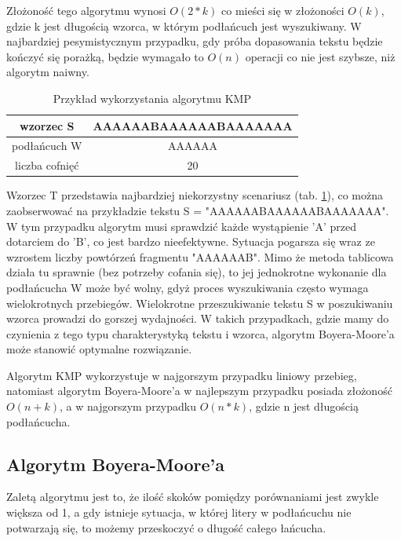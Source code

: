 Złożoność tego algorytmu wynosi $O(2*{k})$ co mieści się w złożoności $O({k})$,
gdzie k jest długością wzorca, w którym podłańcuch jest wyszukiwany. W 
najbardziej pesymistycznym przypadku, gdy próba dopasowania tekstu będzie 
kończyć się porażką, będzie wymagało to $O({n})$ operacji co nie jest szybsze,
niż algorytm naiwny. 

\begin{table}
  \centering
  \begin{tabular}{ |c|c|  } 
    \hline
    wzorzec S & AAAAAABAAAAAABAAAAAAA \\
    \hline
    podłańcuch W & AAAAAA \\
    \hline
    liczba cofnięć & 20 \\
    \hline
  \end{tabular}
  \caption{Przykład wykorzystania algorytmu KMP}
  \label{tabela:KMPExampleSlow}
\end{table}

Wzorzec T przedstawia najbardziej niekorzystny scenariusz 
(tab. \ref{tabela:KMPExampleSlow}), co można zaobserwować na przykładzie tekstu 
S = "AAAAAABAAAAAABAAAAAAA". W tym przypadku algorytm musi sprawdzić każde
wystąpienie 'A' przed dotarciem do 'B', co jest bardzo nieefektywne. Sytuacja 
pogarsza się wraz ze wzrostem liczby powtórzeń fragmentu "AAAAAAB". Mimo że 
metoda tablicowa działa tu sprawnie (bez potrzeby cofania się), to jej 
jednokrotne wykonanie dla podłańcucha W może być wolny, gdyż proces
wyszukiwania często wymaga wielokrotnych przebiegów. Wielokrotne przeszukiwanie
tekstu S w poszukiwaniu wzorca prowadzi do gorszej wydajności. W takich 
przypadkach, gdzie mamy do czynienia z tego typu charakterystyką tekstu 
i wzorca, algorytm Boyera-Moore'a może stanowić optymalne rozwiązanie.

Algorytm KMP wykorzystuje w najgorszym przypadku liniowy przebieg, natomiast
algorytm Boyera-Moore'a w najlepszym przypadku posiada złożoność $O(n+k)$, a w 
najgorszym przypadku $O(n*k)$, gdzie n jest długością podłańcucha.

\subsection{Algorytm Boyera-Moore'a}
\label{sch:algoBoyerMoore}

Zaletą algorytmu jest to, że ilość skoków pomiędzy porównaniami jest zwykle 
większa od 1, a gdy istnieje sytuacja, w której litery w podłańcuchu nie
potwarzają się, to możemy przeskoczyć o długość całego łańcucha.

